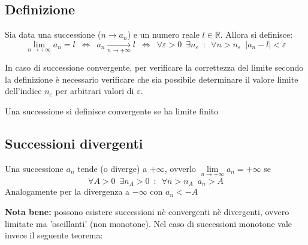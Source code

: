 \documentclass[10pt, oneside]{book}
\theoremstyle{plain}
\begin{document}
\subsection{Definizione}
\begin{defin}
    Sia data una successione ($n \rightarrow a_n$) e un numero reale $l \in \mathbb{R}$. Allora si definisce:
    \[\lim \limits_{n \rightarrow + \infty} a_n = l \enspace \Leftrightarrow \enspace a_n \xrightarrow[n \rightarrow + \infty]{} l \enspace \Leftrightarrow \enspace \forall \varepsilon > 0 \enspace \exists n_\varepsilon \enspace : \enspace \forall n > n_\varepsilon \enspace |a_n - l| < \varepsilon\]
\end{defin}
In caso di successione convergente, per verificare la correttezza del limite secondo la definizione è necessario verificare che sia possibile determinare il valore limite dell'indice $n_\varepsilon$ per arbitrari valori di $\varepsilon$.

\begin{defin}
    Una successione si definisce convergente se ha limite finito
\end{defin}

\subsection{Successioni divergenti}
\begin{defin}
    Una successione $a_n$ tende (o diverge) a $+\infty$, ovverlo $\lim \limits_{n \rightarrow +\infty} a_n = + \infty$ se 
    \[\forall A > 0 \enspace \exists n_A > 0 \enspace : \enspace \forall n> n_A \enspace a_n > A\]
    Analogamente per la divergenza a $-\infty$ con $a_n < -A$
\end{defin}
\textbf{Nota bene: } possono esistere successioni nè convergenti nè divergenti, ovvero limitate ma 'oscillanti' (non monotone). Nel caso di successioni monotone vale invece il seguente teorema:
\end{document}
